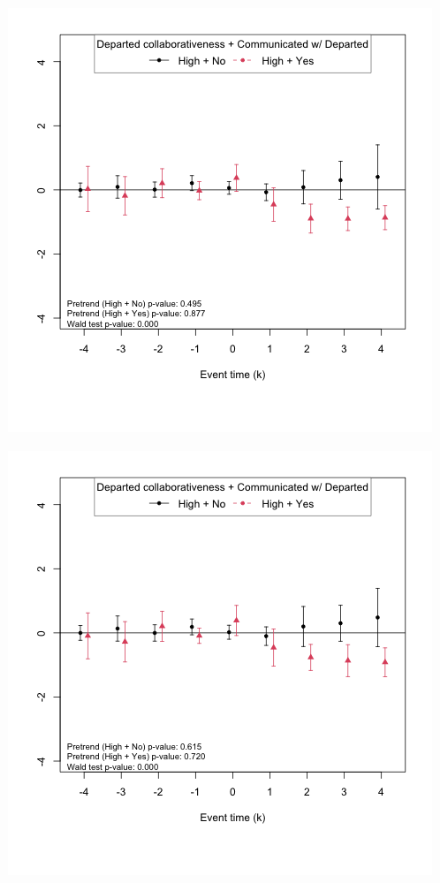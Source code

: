 \begin{figure}[htbp]
\begin{minipage}[b]{0.48\textwidth}
    \end{minipage}
    \begin{minipage}[b]{0.48\textwidth}
        \centering
         \label{fig:predep_prs_opened_high_collab_comm_inv1_rep}
        \includegraphics[width=\textwidth]{temp/output/collab_imp/inv1_cs_norm_prs_opened_dept_never_comm_predep_High.png}
    \end{minipage}
    \hfill
    \begin{minipage}[b]{0.48\textwidth}
        \centering
         \label{fig:predep_n_avg_prs_opened_high_collab_comm_inv1}
        \includegraphics[width=\textwidth]{temp/output/collab_imp/inv1_cs_norm_n_avg_prs_opened_dept_never_comm_predep_High.png}

\end{minipage}
\end{figure}
